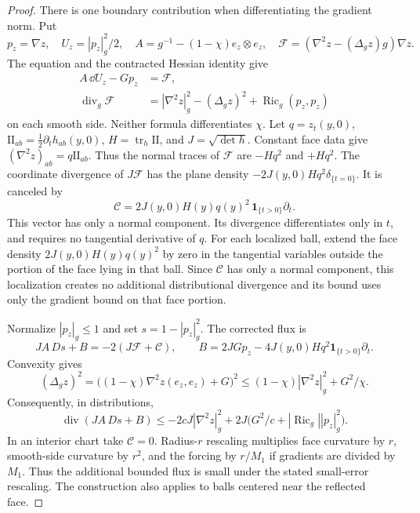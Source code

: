 \begin{proof}
There is one boundary contribution when differentiating the gradient norm.
Put
\[
 p_z=\nabla z,\quad U_z=|p_z|_g^2/2,\quad
 A=g^{-1}-(1-\chi)e_z\otimes e_z,\quad
 \mathcal F=(\nabla^2z-(\Delta_gz)g)\nabla z.
\]
The equation and the contracted Hessian identity give
\begin{align}
 A\,\dd U_z-Gp_z&=\mathcal F,
 \label{pde:gradient-flux}\\
 \operatorname{div}_g\mathcal F
 &=|\nabla^2z|_g^2-(\Delta_gz)^2+\operatorname{Ric}_g(p_z,p_z)
 \label{pde:bochner-flux}
\end{align}
on each smooth side.  Neither formula differentiates \(\chi\).
Let \(q=z_t(y,0)\),
\(\mathrm{II}_{ab}=\tfrac12\partial_t h_{ab}(y,0)\),
\(H=\operatorname{tr}_h\mathrm{II}\), and \(J=\sqrt{\det h}\).
Constant face data give \((\nabla^2z)_{ab}=q\mathrm{II}_{ab}\).
Thus the normal traces of \(\mathcal F\) are \(-Hq^2\) and \(+Hq^2\).
The coordinate divergence of \(J\mathcal F\) has the plane density
\(-2J(y,0)Hq^2\delta_{\{t=0\}}\).  It is canceled by
\begin{equation}
 \mathcal C
 =2J(y,0)H(y)q(y)^2\,\mathbf1_{\{t>0\}}\partial_t.
 \label{pde:face-correction}
\end{equation}
This vector has only a normal component.  Its divergence differentiates
only in \(t\), and requires no tangential derivative of \(q\).
For each localized ball, extend the face density
\(2J(y,0)H(y)q(y)^2\) by zero in the tangential variables outside
the portion of the face lying in that ball.  Since \(\mathcal C\)
has only a normal component, this localization creates no additional
distributional divergence and its bound uses only the gradient bound
on that face portion.

Normalize \(|p_z|_g\le1\) and set \(s=1-|p_z|_g^2\).  The corrected flux is
\[
 JA\,Ds+B=-2(J\mathcal F+\mathcal C),\qquad
 B=2JGp_z-4J(y,0)Hq^2\mathbf1_{\{t>0\}}\partial_t.
\]
Convexity gives
\[
 (\Delta_gz)^2
 =\big((1-\chi)\nabla^2z(e_z,e_z)+G\big)^2
 \le(1-\chi)|\nabla^2z|_g^2+G^2/\chi.
\]
Consequently, in distributions,
\begin{equation}
 \operatorname{div}(JA\,Ds+B)
 \le-2cJ|\nabla^2z|_g^2
       +2J\big(G^2/c+|\operatorname{Ric}_g||p_z|_g^2\big).
 \label{pde:deficit-inequality}
\end{equation}
In an interior chart take \(\mathcal C=0\).
Radius-\(r\) rescaling multiplies face curvature by \(r\), smooth-side
curvature by \(r^2\), and the forcing by \(r/M_1\) if gradients are
divided by \(M_1\).  Thus the additional bounded flux is small under
the stated small-error rescaling.  The construction also applies to
balls centered near the reflected face.


\end{proof}
